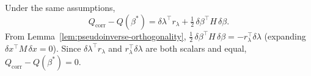 \begin{corollary}\label{cor:exact-correction}
Under the same assumptions,
\[
  Q_{\mathrm{corr}} - Q(\beta^*)
  = \delta\lambda^\top r_\lambda + \tfrac{1}{2}\,\delta\beta^\top H\,\delta\beta.
\]
From Lemma~\ref{lem:pseudoinverse-orthogonality},
$\tfrac{1}{2}\,\delta\beta^\top H\,\delta\beta = -r_\lambda^\top\delta\lambda$
(expanding $\delta x^\top M\,\delta x = 0$).
Since $\delta\lambda^\top r_\lambda$ and $r_\lambda^\top\delta\lambda$ are
both scalars and equal, $Q_{\mathrm{corr}} - Q(\beta^*) = 0$.
\end{corollary}
